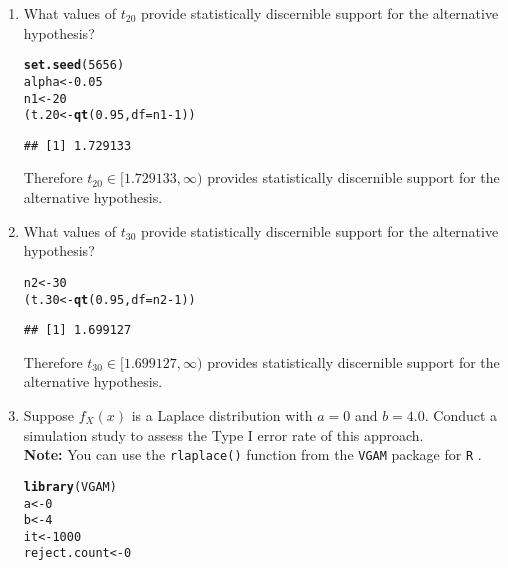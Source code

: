\documentclass{article}\usepackage[]{graphicx}\usepackage[]{xcolor}
\makeatletter
\newcommand{\hlnum}[1]{\textcolor[rgb]{0.686,0.059,0.569}{#1}}%
\newcommand{\hlopt}[1]{\textcolor[rgb]{0,0,0}{#1}}%
\newcommand{\hldef}[1]{\textcolor[rgb]{0.345,0.345,0.345}{#1}}%
\newcommand{\hlkwb}[1]{\textcolor[rgb]{0.69,0.353,0.396}{#1}}%
\newcommand{\hlkwc}[1]{\textcolor[rgb]{0.333,0.667,0.333}{#1}}%
\newcommand{\hlkwd}[1]{\textcolor[rgb]{0.737,0.353,0.396}{\textbf{#1}}}%
\newenvironment{kframe}{%
 \def\at@end@of@kframe{}%
 \ifinner\ifhmode%
  \def\at@end@of@kframe{\end{minipage}}%
  \begin{minipage}{\columnwidth}%
 \fi\fi%
 \def\FrameCommand##1{\hskip\@totalleftmargin \hskip-\fboxsep
 \colorbox{shadecolor}{##1}\hskip-\fboxsep
     \hskip-\linewidth \hskip-\@totalleftmargin \hskip\columnwidth}%
 \MakeFramed {\advance\hsize-\width
   \@totalleftmargin\z@ \linewidth\hsize
   \@setminipage}}%
 {\par\unskip\endMakeFramed%
 \at@end@of@kframe}
\newenvironment{knitrout}{}{} %
\makeatother
\begin{document}
\begin{enumerate}
\begin{enumerate}
  \item What values of $t_{20}$ provide statistically discernible support for the
  alternative hypothesis?
\begin{knitrout}\scriptsize
{}\color{fgcolor}\begin{kframe}
\begin{alltt}
\hlkwd{set.seed}\hldef{(}\hlnum{5656}\hldef{)}
\hldef{alpha} \hlkwb{<-} \hlnum{0.05}
\hldef{n1} \hlkwb{<-} \hlnum{20}
\hldef{(t.20} \hlkwb{<-} \hlkwd{qt}\hldef{(}\hlnum{0.95}\hldef{,} \hlkwc{df} \hldef{= n1}\hlopt{-}\hlnum{1}\hldef{))}
\end{alltt}
\begin{verbatim}
## [1] 1.729133
\end{verbatim}
\end{kframe}
\end{knitrout}
Therefore $t_{20} \in [1.729133,\infty)$ provides statistically discernible support for the alternative hypothesis.
  \item What values of $t_{30}$ provide statistically discernible support for the
  alternative hypothesis?
\begin{knitrout}\scriptsize
{}\color{fgcolor}\begin{kframe}
\begin{alltt}
\hldef{n2} \hlkwb{<-} \hlnum{30}
\hldef{(t.30} \hlkwb{<-} \hlkwd{qt}\hldef{(}\hlnum{0.95}\hldef{,} \hlkwc{df} \hldef{= n2}\hlopt{-}\hlnum{1}\hldef{))}
\end{alltt}
\begin{verbatim}
## [1] 1.699127
\end{verbatim}
\end{kframe}
\end{knitrout}
Therefore $t_{30} \in [1.699127,\infty)$ provides statistically discernible support for the alternative hypothesis.
  \item Suppose $f_X(x)$ is a Laplace distribution with $a=0$ and $b=4.0$.
  Conduct a simulation study to assess the Type I error rate of this approach.\\
  \textbf{Note:} You can use the \texttt{rlaplace()} function from the \texttt{VGAM}
  package for \texttt{R} \citep{VGAM}.
\begin{knitrout}\scriptsize
{}\color{fgcolor}\begin{kframe}
\begin{alltt}
\hlkwd{library}\hldef{(VGAM)}
\hldef{a} \hlkwb{<-} \hlnum{0}
\hldef{b} \hlkwb{<-} \hlnum{4}
\hldef{it} \hlkwb{<-} \hlnum{1000}
\hldef{reject.count} \hlkwb{<-} \hlnum{0}


\end{alltt}
\end{kframe}
\end{knitrout}
\end{enumerate}
\end{enumerate}
\end{document}
